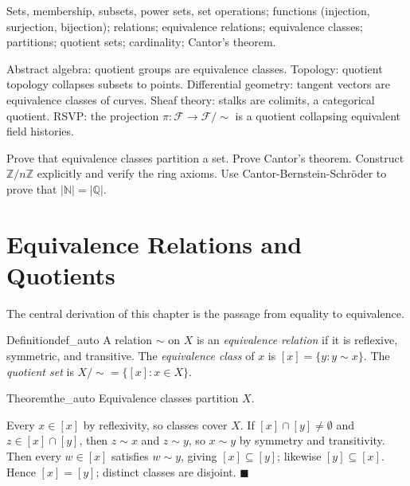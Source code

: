 \documentclass[12pt, twoside, openright, a4paper]{book}
\renewenvironment{proof}{%
  \par\medskip\noindent{\color{RSVPgreen}\bfseries\sffamily Proof.}\enspace\ignorespaces
}{\hfill{\color{RSVPgreen}$\blacksquare$}\par\medskip}
\newcommand{\N}{\mathbb{N}}
\newcommand{\Z}{\mathbb{Z}}
\newcommand{\Q}{\mathbb{Q}}
\begin{document}
\begin{structures}
Sets, membership, subsets, power sets, set operations; functions (injection, surjection, bijection); relations; equivalence relations; equivalence classes; partitions; quotient sets; cardinality; Cantor's theorem.
\end{structures}

\begin{dependencies}
Abstract algebra: quotient groups are equivalence classes.
Topology: quotient topology collapses subsets to points.
Differential geometry: tangent vectors are equivalence classes of curves.
Sheaf theory: stalks are colimits, a categorical quotient.
RSVP: the projection $\pi: \mathcal{F} \to \mathcal{F}/{\sim}$ is a quotient collapsing equivalent field histories.
\end{dependencies}

\begin{exercises_box}
Prove that equivalence classes partition a set.
Prove Cantor's theorem.
Construct $\Z/n\Z$ explicitly and verify the ring axioms.
Use Cantor-Bernstein-Schr\"oder to prove that $|\N| = |\Q|$.
\end{exercises_box}

\section{Equivalence Relations and Quotients}

The central derivation of this chapter is the passage from equality to equivalence.

\begin{definition}{Definition}{def_auto}
A relation $\sim$ on $X$ is an \emph{equivalence relation} if it is reflexive, symmetric, and transitive.
The \emph{equivalence class} of $x$ is $[x] = \{y : y \sim x\}$.
The \emph{quotient set} is $X/{\sim} = \{[x] : x \in X\}$.
\end{definition}

\begin{theorem}{Theorem}{the_auto}
Equivalence classes partition $X$.
\end{theorem}
\begin{proof}
Every $x \in [x]$ by reflexivity, so classes cover $X$.
If $[x] \cap [y] \neq \emptyset$ and $z \in [x] \cap [y]$, then $z \sim x$ and $z \sim y$, so $x \sim y$ by symmetry and transitivity.
Then every $w \in [x]$ satisfies $w \sim y$, giving $[x] \subseteq [y]$; likewise $[y] \subseteq [x]$.
Hence $[x] = [y]$; distinct classes are disjoint.
\end{proof}
\end{document}
